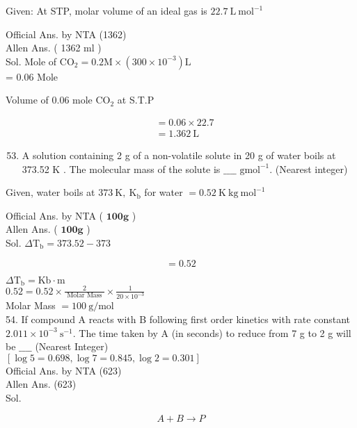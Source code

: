 \documentclass[10pt]{article}
\begin{document}
Given: At STP, molar volume of an ideal gas is \(22.7 \mathrm{~L} \mathrm{~mol}^{-1}\)

Official Ans. by NTA (1362)\\
Allen Ans. ( 1362 ml )\\
Sol. Mole of \(\mathrm{CO}_{2}=0.2 \mathrm{M} \times\left(300 \times 10^{-3}\right) \mathrm{L}\)\\
= 0.06 Mole

Volume of 0.06 mole \(\mathrm{CO}_{2}\) at S.T.P

\[
\begin{aligned}
& =0.06 \times 22.7 \\
& =1.362 \mathrm{~L}
\end{aligned}
\]

\begin{enumerate}
  \setcounter{enumi}{52}
  \item A solution containing 2 g of a non-volatile solute in 20 g of water boils at 373.52 K . The molecular mass of the solute is \(\_\_\_\_\) \(\mathrm{g} \mathrm{mol}^{-1}\). (Nearest integer)
\end{enumerate}

Given, water boils at \(373 \mathrm{~K}, \mathrm{~K}_{\mathrm{b}}\) for water \(=0.52 \mathrm{~K} \mathrm{~kg} \mathrm{~mol}^{-1}\)

Official Ans. by NTA ( \(\mathbf{1 0 0 g}\) )\\
Allen Ans. ( \(\mathbf{1 0 0 g}\) )\\
Sol. \(\Delta \mathrm{T}_{\mathrm{b}}=373.52-373\)

\[
=0.52
\]

\(\Delta \mathrm{T}_{\mathrm{b}}=\mathrm{Kb} \cdot \mathrm{m}\)\\
\(0.52=0.52 \times \frac{2}{\text { Molar Mass }} \times \frac{1}{20 \times 10^{-3}}\)\\
Molar Mass \(=100 \mathrm{~g} / \mathrm{mol}\)\\
54. If compound A reacts with B following first order kinetics with rate constant \(2.011 \times 10^{-3} \mathrm{~s}^{-1}\). The time taken by A (in seconds) to reduce from 7 g to 2 g will be \(\_\_\_\_\) (Nearest Integer)\\
\([\log 5=0.698, \log 7=0.845, \log 2=0.301]\)\\
Official Ans. by NTA (623)\\
Allen Ans. (623)\\
Sol.

\[
A+B \rightarrow P
\]
\end{document}

